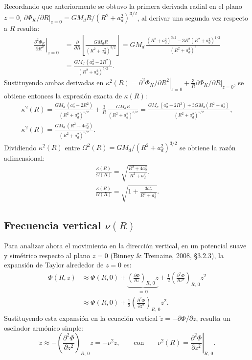 \documentclass[11pt,letterpaper]{article}
\begin{document}
Recordando que anteriormente se obtuvo la primera derivada radial en el plano $z = 0$, $\left.\partial\Phi_K/\partial R\right|_{z=0} = GM_d R/(R^2 + a_d^2)^{3/2}$, al derivar una segunda vez respecto a $R$ resulta:
\begin{align}
    \left.\frac{\partial^2 \Phi_K}{\partial R^2}\right|_{z=0}
    &= \frac{\partial}{\partial R}\!\left[\frac{GM_d R}{(R^2 + a_d^2)^{3/2}}\right]
    = GM_d\,\frac{(R^2 + a_d^2)^{3/2} - 3R^2(R^2 + a_d^2)^{1/2}}{(R^2 + a_d^2)^3} \nonumber \\
    &= \frac{GM_d\,(a_d^2 - 2R^2)}{(R^2 + a_d^2)^{5/2}}.
\end{align}
Sustituyendo ambas derivadas en $\kappa^2(R) = \left.\partial^2\Phi_K/\partial R^2\right|_{z=0} + \frac{3}{R}\left.\partial\Phi_K/\partial R\right|_{z=0}$, se obtiene entonces la expresión exacta de $\kappa(R)$:
\begin{gather}
    \kappa^2(R) = \frac{GM_d\,(a_d^2 - 2R^2)}{(R^2 + a_d^2)^{5/2}} + \frac{3}{R}\,\frac{GM_d R}{(R^2 + a_d^2)^{3/2}}
    = \frac{GM_d\,(a_d^2 - 2R^2) + 3GM_d(R^2 + a_d^2)}{(R^2 + a_d^2)^{5/2}}, \nonumber \\[4pt]
    \boxed{\kappa^2(R) = \frac{GM_d\,(R^2 + 4a_d^2)}{(R^2 + a_d^2)^{5/2}}}.
    \label{eq:kappa_kuzmin}
\end{gather}
Dividiendo $\kappa^2(R)$ entre $\Omega^2(R) = GM_d/(R^2 + a_d^2)^{3/2}$ se obtiene la razón adimensional:
\begin{gather}
    \frac{\kappa(R)}{\Omega(R)} = \sqrt{\frac{R^2 + 4a_d^2}{R^2 + a_d^2}}, \nonumber \\[4pt]
    \boxed{\frac{\kappa(R)}{\Omega(R)} = \sqrt{1 + \frac{3a_d^2}{R^2 + a_d^2}}}.
    \label{eq:kappa_over_omega}
\end{gather}

\subsection{Frecuencia vertical \texorpdfstring{$\nu(R)$}{nu(R)}}

Para analizar ahora el movimiento en la dirección vertical, en un potencial suave y simétrico respecto al plano $z = 0$ (Binney \& Tremaine, 2008, \S 3.2.3), la expansión de Taylor alrededor de $z = 0$ es:
\begin{align}
    \Phi(R, z)
    &\approx \Phi(R, 0)
    + \underbrace{\left(\frac{\partial \Phi}{\partial z}\right)_{R,\,0} z}_{=\,0}
    + \frac{1}{2}\left(\frac{\partial^2 \Phi}{\partial z^2}\right)_{R,\,0} z^2 \nonumber \\
    &\approx \Phi(R, 0)
    + \frac{1}{2}\left(\frac{\partial^2 \Phi}{\partial z^2}\right)_{R,\,0} z^2.
\end{align}
Sustituyendo esta expansión en la ecuación vertical $\ddot{z} = -\partial\Phi/\partial z$, resulta un oscilador armónico simple:
\begin{equation}
    \ddot{z} \approx -\left(\frac{\partial^2 \Phi}{\partial z^2}\right)_{R,\,0} z = -\nu^2 z,
    \qquad \text{con} \qquad
    \nu^2(R) = \left.\frac{\partial^2 \Phi}{\partial z^2}\right|_{R,\,0}.
\end{equation}
\end{document}
